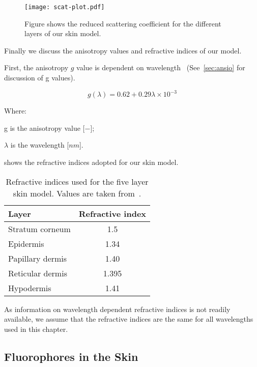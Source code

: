 \begin{figure}[!htpb]
	\centering
	\texttt{[image: scat-plot.pdf]}
	\caption{Figure shows the reduced scattering coefficient for the different layers of our skin model.}
	\label{fig:scatplot}
\end{figure}

\FloatBarrier

Finally we discuss the anisotropy values and refractive indices of our model.

First, the anisotropy $g$ value is dependent on wavelength~\cite{louisethesis,van1989skin} (See~\cref{sec:ansio} for discussion of g values).

\begin{equation}
g(\lambda)=0.62+0.29\lambda\times10^{-3}
\end{equation}

\noindent Where:

\indent g is the anisotropy value [$-$];

\indent $\lambda$ is the wavelength [$nm$].

\medskip

 shows the refractive indices adopted for our skin model.

\begin{table}[!htpb]
  \centering

  \begin{tabular}{l|c}
  \hline
  Layer & Refractive index \\
  \hline
    Stratum corneum & 1.5 \\
    Epidermis &  1.34\\
    Papillary dermis & 1.40 \\
    Reticular dermis &  1.395\\
    Hypodermis &  1.41\\

  \hline
  \end{tabular}
    \caption{Refractive indices used for the five layer skin model. Values are taken from~\cite{meglinski2002quantitative}.}
  \label{tab:refindex}
\end{table}

As information on wavelength dependent refractive indices is not readily available, we assume that the refractive indices are the same for all wavelengths used in this chapter.

\subsection{Fluorophores in the Skin}

